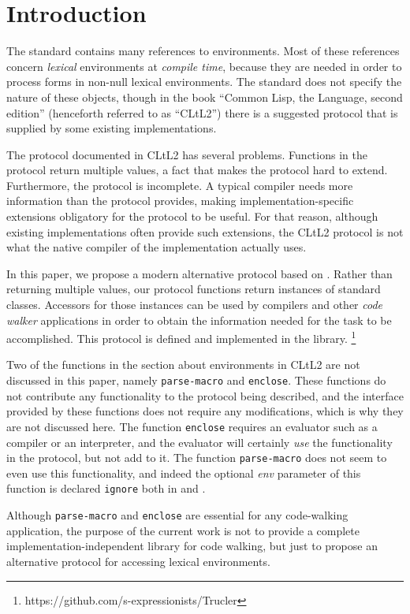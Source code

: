 \section{Introduction}

The \commonlisp{} standard \cite{ansi:common:lisp} contains many
references to environments.  Most of these references concern
\emph{lexical} environments at \emph{compile time}, because they are
needed in order to process forms in non-null lexical environments.
The standard does not specify the nature of these objects, though in
the book ``Common Lisp, the Language, second edition''
\cite{Steele:1990:CLL:95411} (henceforth referred to as ``CLtL2'')
there is a suggested protocol that is supplied by some existing
\commonlisp{} implementations.

The protocol documented in CLtL2 has several problems.  Functions in
the protocol return multiple values, a fact that makes the protocol
hard to extend.  Furthermore, the protocol is incomplete.  A typical
compiler needs more information than the protocol provides, making
implementation-specific extensions obligatory for the protocol to be
useful.  For that reason, although existing \commonlisp{}
implementations often provide such extensions, the CLtL2 protocol is
not what the native compiler of the implementation actually uses.

In this paper, we propose a modern alternative protocol based on
\clos{}.  Rather than returning multiple values, our protocol
functions return instances of standard classes.  Accessors for those
instances can be used by compilers and other \emph{code walker}
applications in order to obtain the information needed for the task to
be accomplished.  This protocol is defined and implemented in the
\trucler{} library.%
\footnote{https://github.com/s-expressionists/Trucler}

Two of the functions in the section about environments in CLtL2 are
not discussed in this paper, namely \texttt{parse-macro} and
\texttt{enclose}.  These functions do not contribute any functionality
to the protocol being described, and the interface provided by these
functions does not require any modifications, which is why they are
not discussed here.  The function \texttt{enclose} requires an
evaluator such as a compiler or an interpreter, and the evaluator will
certainly \emph{use} the functionality in the protocol, but not add to
it.  The function \texttt{parse-macro} does not seem to even use this
functionality, and indeed the optional \textit{env} parameter of this
function is declared \texttt{ignore} both in \sbcl{} and \ccl{}.

Although \texttt{parse-macro} and \texttt{enclose} are essential for
any code-walking application, the purpose of the current work is not
to provide a complete implementation-independent library for code
walking, but just to propose an alternative protocol for accessing
lexical environments.

